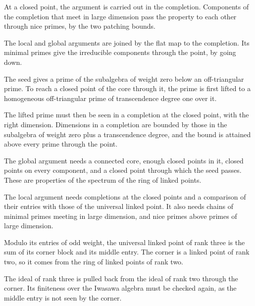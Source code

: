 At a closed point, the argument is carried out in the completion. Components of the completion that meet in large dimension pass the property to each other through nice primes, by the two patching bounds.

The local and global arguments are joined by the flat map to the completion. Its minimal primes give the irreducible components through the point, by going down.

The seed gives a prime of the subalgebra of weight zero below an off-triangular prime. To reach a closed point of the core through it, the prime is first lifted to a homogeneous off-triangular prime of transcendence degree one over it.

The lifted prime must then be seen in a completion at the closed point, with the right dimension. Dimensions in a completion are bounded by those in the subalgebra of weight zero plus a transcendence degree, and the bound is attained above every prime through the point.

The global argument needs a connected core, enough closed points in it, closed points on every component, and a closed point through which the seed passes. These are properties of the spectrum of the ring of linked points.

The local argument needs completions at the closed points and a comparison of their entries with those of the universal linked point. It also needs chains of minimal primes meeting in large dimension, and nice primes above primes of large dimension.

Modulo its entries of odd weight, the universal linked point of rank three is the sum of its corner block and its middle entry. The corner is a linked point of rank two, so it comes from the ring of linked points of rank two.

The ideal of rank three is pulled back from the ideal of rank two through the corner. Its finiteness over the Iwasawa algebra must be checked again, as the middle entry is not seen by the corner.

